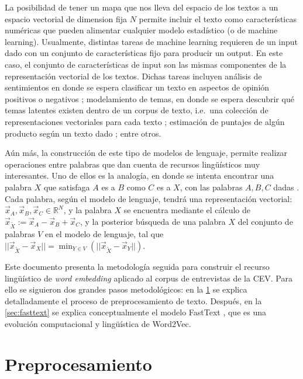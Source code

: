 \documentclass[
  spanish,
]{article}
\begin{document}
La posibilidad de tener un mapa que nos lleva del espacio de los textos
a un espacio vectorial de dimension fija \(N\) permite incluir el texto
como características numéricas que pueden alimentar cualquier modelo
estadístico (o de machine learning). Usualmente, distintas tareas de
machine learning requieren de un input dado con un conjunto de
características fijo para producir un output. En este caso, el conjunto
de características de input son las mismas componentes de la
representación vectorial de los textos. Dichas tareas incluyen análisis
de sentimientos en donde se espera clasificar un texto en aspectos de
opinión positivos o negativos \citep{tang2014learning}; modelamiento de
temas, en donde se espera descubrir qué temas latentes existen dentro de
un corpus de texto, i.e.~una colección de representaciones vectoriales
para cada texto \citep{li2016topic, yi2020topic}; estimación de puntajes
de algún producto según un texto dado \citep{suryadi2018systematic};
entre otros.

Aún más, la construcción de este tipo de modelos de lenguaje, permite
realizar operaciones entre palabras que dan cuenta de recursos
lingüísticos muy interesantes. Uno de ellos es la analogía, en donde se
intenta encontrar una palabra \(X\) que satisfaga \(A\) es a \(B\) como
\(C\) es a \(X\), con las palabras \(A,B,C\) dadas
\citep{hartmann2017portuguese}. Cada palabra, según el modelo de
lenguaje, tendrá una representación vectorial:
\(\vec{x}_A,\vec{x}_B,\vec{x}_C\in\mathbb{R}^N\), y la palabra \(X\) se
encuentra mediante el cálculo de
\(\vec{x}_{\tilde{X}} := \vec{x}_A-\vec{x}_B+\vec{x}_C\), y la posterior
búsqueda de una palabra \(X\) del conjunto de palabras \(V\) en el
modelo de lenguaje, tal que
\(||\vec{x}_{\tilde{X}}-\vec{x}_X|| = \min_{Y\in V}(||\vec{x}_{\tilde{X}}-\vec{x}_Y||)\).

Este documento presenta la metodología seguida para construir el recurso
lingüístico de \emph{word embedding} aplicado al corpus de entrevistas
de la CEV. Para ello se siguieron dos grandes pasos metodológicos: en la
\cref{sec:preprocess} se explica detalladamente el proceso de
preprocesamiento de texto. Después, en la \cref{sec:fasttext} se explica
conceptualmente el modelo FastText
\citep{joulin2016fasttext, joulin2016bag, bojanowski2016enriching}, que
es una evolución computacional y lingüística de Word2Vec.

\section{Preprocesamiento}
\label{sec:preprocess}
\end{document}
